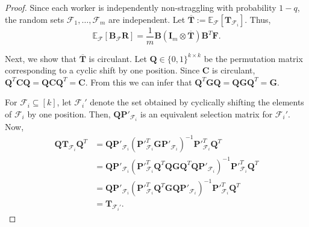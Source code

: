 \documentclass[journal,draftcls,onecolumn]{IEEEtran}
\theoremstyle{mystyle}
\newcommand{\bfF}{\mathbf{F}}
\newcommand{\bfT}{\mathbf{T}}
\newcommand{\bfB}{\mathbf{B}}
\newcommand{\bfR}{\mathbf{R}}
\newcommand{\cF}{\mathcal{F}}
\begin{document}
\begin{proof}
Since each worker is independently non-straggling with probability
$1-q$, the random sets $\mathcal{F}_1,\ldots,\mathcal{F}_m$ are
independent. Let
$
\overline{\mathbf{T}}
:=
\mathbb{E}_{\mathcal{F}}
[\mathbf{T}_{\mathcal{F}_i}]
.$ Thus,
\[
\mathbb{E}_{\mathcal{F}}
\left[
\bfB_{\cF}\bfR
\right]
=
\frac{1}{m} \bfB (\mathbf{I}_m\otimes\overline{\mathbf{T}}) \mathbf{B}^T \bfF.
\]

Next, we show that $\overline{\mathbf{T}}$ is circulant. Let
$\mathbf{Q}\in\{0,1\}^{k\times k}$ be the permutation matrix
corresponding to a cyclic shift by one position. Since $\mathbf{C}$
is circulant,
$
\mathbf{Q}^T\mathbf{C}\mathbf{Q}=\mathbf{Q}\mathbf{C}\mathbf{Q}^T =\mathbf{C}.
$ From this we can infer that $\mathbf{Q}^T\mathbf{G}\mathbf{Q} = \mathbf{Q}\mathbf{G}\mathbf{Q}^T
= \mathbf{G}$.


For $\mathcal{F}_i\subseteq[k]$, let $\mathcal{F}_i'$
denote the set obtained by cyclically shifting the elements of
$\mathcal{F}_i$ by one position. Then,
$\mathbf{Q}\mathbf{P}'_{\mathcal{F}_i}$ is an equivalent selection
matrix for $\mathcal{F}_i'$. 
Now,
\begin{align*}
\mathbf{Q} \bfT_{\mathcal{F}_i} \mathbf{Q}^T &= \mathbf{Q} \mathbf{P}'_{\mathcal{F}_i}
\left(
\mathbf{P}'^{T}_{\mathcal{F}_i}
\mathbf{G}
\mathbf{P}'_{\mathcal{F}_i}
\right)^{-1}
\mathbf{P}'^{T}_{\mathcal{F}_i} \mathbf{Q}^T\\
&= \mathbf{Q} \mathbf{P}'_{\mathcal{F}_i}
\left(
\mathbf{P}'^{T}_{\mathcal{F}_i}\mathbf{Q}^T\mathbf{Q}
\mathbf{G}\mathbf{Q}^T\mathbf{Q}
\mathbf{P}'_{\mathcal{F}_i}
\right)^{-1}
\mathbf{P}'^{T}_{\mathcal{F}_i} \mathbf{Q}^T\\
&= \mathbf{Q} \mathbf{P}'_{\mathcal{F}_i}
\left(
\mathbf{P}'^{T}_{\mathcal{F}_i}\mathbf{Q}^T
\mathbf{G}\mathbf{Q}
\mathbf{P}'_{\mathcal{F}_i}
\right)^{-1}
\mathbf{P}'^{T}_{\mathcal{F}_i} \mathbf{Q}^T\\
& = \bfT_{\cF_i'}.
\end{align*}



\end{proof}
\end{document}

